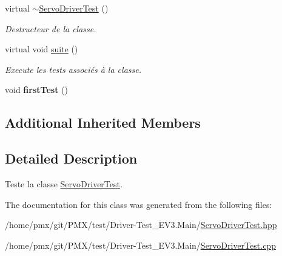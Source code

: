 \begin{DoxyCompactItemize}
\mbox{\label{classtest_1_1ServoDriverTest_a50888741be5b2e7395ebe58e757851a7}} 
virtual \hyperlink{classtest_1_1ServoDriverTest_a50888741be5b2e7395ebe58e757851a7}{$\sim$\+Servo\+Driver\+Test} ()
\begin{DoxyCompactList}\small\item\em Destructeur de la classe. \end{DoxyCompactList}\item 
\mbox{\label{classtest_1_1ServoDriverTest_a5514eae697bf85758620caba88165f19}} 
virtual void \hyperlink{classtest_1_1ServoDriverTest_a5514eae697bf85758620caba88165f19}{suite} ()
\begin{DoxyCompactList}\small\item\em Execute les tests associés à la classe. \end{DoxyCompactList}\item 
\mbox{\label{classtest_1_1ServoDriverTest_a61eb605a2cf0764980eef97d2a440d58}} 
void {\bfseries first\+Test} ()
\end{DoxyCompactItemize}
\subsection*{Additional Inherited Members}


\subsection{Detailed Description}
Teste la classe \hyperlink{classtest_1_1ServoDriverTest}{Servo\+Driver\+Test}. 

The documentation for this class was generated from the following files\+:\begin{DoxyCompactItemize}
\item 
/home/pmx/git/\+P\+M\+X/test/\+Driver-\/\+Test\+\_\+\+E\+V3.\+Main/\hyperlink{Driver-Test__EV3_8Main_2ServoDriverTest_8hpp}{Servo\+Driver\+Test.\+hpp}\item 
/home/pmx/git/\+P\+M\+X/test/\+Driver-\/\+Test\+\_\+\+E\+V3.\+Main/\hyperlink{Driver-Test__EV3_8Main_2ServoDriverTest_8cpp}{Servo\+Driver\+Test.\+cpp}\end{DoxyCompactItemize}
